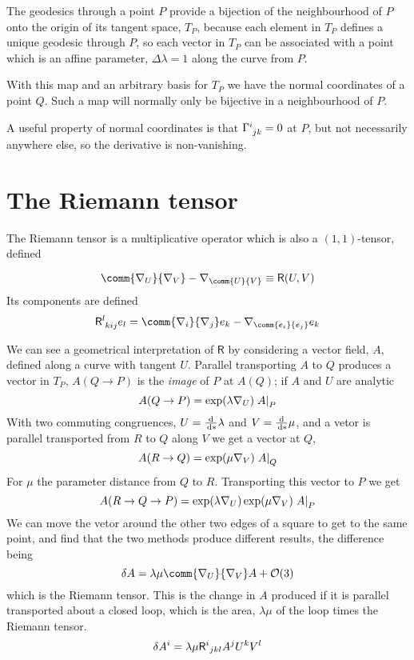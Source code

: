 The geodesics through a point $P$ provide a bijection of the
neighbourhood of $P$ onto the origin of its tangent space, $T_P$,
because each element in $T_P$ defines a unique geodesic through $P$,
so each vector in $T_P$ can be associated with a point which is an
affine parameter, $\Delta \lambda =1$ along the curve from $P$.

With this map and an arbitrary basis for $T_P$ we have the normal
coordinates of a point $Q$. Such a map will normally only be bijective
in a neighbourhood of $P$.

A useful property of normal coordinates is that
$\tensor{\Gamma}{^i_{jk}} = 0$ at $P$, but not necessarily anywhere
else, so the derivative is non-vanishing.

\section{The Riemann tensor}
\label{sec:riemann-tensor}

The Riemann tensor is a multiplicative operator which is also a
$(1,1)$-tensor, defined

\newcommand{\rie}{\mathbf{\mathsf{R}}}
\begin{definition}
  \begin{equation}
    \label{eq:59}
    \comm{\nabla_U}{\nabla_V} - \nabla_{\comm{U}{V}} \equiv \rie(U,V)
  \end{equation}
Its components are defined
\[ \tensor{\rie}{^l_{kij}} e_l = \comm{\nabla_i}{\nabla_j} e_k - \nabla_{\comm{e_i}{e_j}} e_k \]
\end{definition}
 
We can see a geometrical interpretation of $\rie$ by considering a
vector field, $A$, defined along a curve with tangent $U$. Parallel
transporting $A$ to $Q$ produces a vector in $T_P$, $A(Q \to P)$ is
the \emph{image} of $P$ at $A(Q)$; if $A$ and $U$ are analytic
\[ A(Q \to P) = \exp( \lambda \nabla_U ) \left. A \right|_P \] With two
commuting congruences, $U = \frac{\mathrm{d}}{\,\mathrm{d} *}{\lambda}$ and $V = \frac{\mathrm{d}}{\,\mathrm{d} *}{\mu}$, and a
vetor is parallel transported from $R$ to $Q$ along $V$ we get a
vector at $Q$,
\[ A(R \to Q) = \exp(\mu \nabla_V) \left. A \right|_Q \] For $\mu$ the
parameter distance from $Q$ to $R$. Transporting this vector to $P$ we
get
\[ A(R \to Q \to P) = \exp(\lambda \nabla_U) \exp(\mu \nabla_V)
\left. A \right|_P \] We can move the vetor around the other two edges of a
square to get to the same point, and find that the two methods produce
different results, the difference being
\begin{equation}
  \label{eq:61}
  \delta A = \lambda \mu \comm{\nabla_U}{\nabla_V} A + \mathcal{O}(3)
\end{equation}
which is the Riemann tensor. This is the change in $A$ produced if it
is parallel transported about a closed loop, which is the area,
$\lambda \mu$ of the loop times the Riemann tensor.
\[ \delta A^i = \lambda \mu \tensor{\rie}{^i}{_{jkl}}A^j U^k V^l \]

